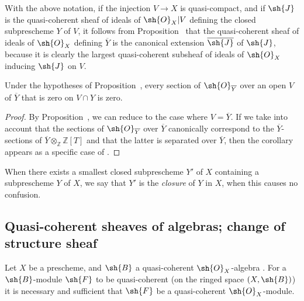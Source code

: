 With the above notation, if the injection $V\to X$ is quasi-compact, and if $\sh{J}$ is the quasi-coherent sheaf of ideals of $\sh{O}_X|V$ defining the closed subprescheme $Y$ of $V$, it follows from Proposition~ that the quasi-coherent sheaf of ideals of $\sh{O}_X$ defining $\overline{Y}$ is the canonical extension  $\overline{\sh{J}}$ of $\sh{J}$, because it is clearly the largest quasi-coherent subsheaf of ideals of $\sh{O}_X$ inducing $\sh{J}$ on $V$.

\begin{corollary}[9.5.11]
\label{I.9.5.11}
Under the hypotheses of Proposition~, every section of $\sh{O}_{\overline{Y}}$ over an open $V$ of $\overline{Y}$ that is zero on $V\cap Y$ is zero.
\end{corollary}

\begin{proof}
By Proposition~, we can reduce to the case where $V=\overline{Y}$.
If we take into account that the sections of $\sh{O}_{\overline{Y}}$ over $\overline{Y}$ canonically correspond to the $\overline{Y}$-sections of $\overline{Y}\otimes_{\mathbb Z}\mathbb Z[T]$  and that the latter is separated over $\overline{Y}$, then the corollary appears as a specific case of .
\end{proof}

When there exists a smallest closed subprescheme $Y'$ of $X$ containing a subprescheme $Y$ of $X$, we say that $Y'$ is the \emph{closure} of $Y$ in $X$, when this causes no confusion.

\subsection{Quasi-coherent sheaves of algebras; change of structure sheaf}
\label{subsection:I.9.6}
\label{I.9.6}

\begin{proposition}[9.6.1]
\label{I.9.6.1}
Let $X$ be a prescheme, and $\sh{B}$ a quasi-coherent $\sh{O}_X$-algebra .
For a $\sh{B}$-module $\sh{F}$ to be quasi-coherent (on the ringed space $(X,\sh{B})$) it is necessary and sufficient that $\sh{F}$ be a quasi-coherent $\sh{O}_X$-module.
\end{proposition}

